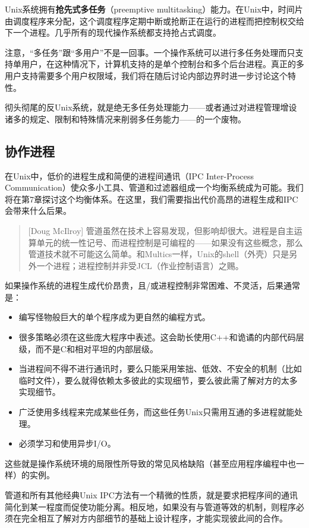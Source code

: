 \documentclass[12pt,oneside]{book}
\begin{document}
Unix系统拥有\textbf{抢先式多任务}（preemptive multitasking）能力。在Unix中，时间片由调度程序来分配，这个调度程序定期中断或抢断正在运行的进程而把控制权交给下一个进程。几乎所有的现代操作系统都支持抢占式调度。

注意，“多任务”跟“多用户”不是一回事。一个操作系统可以进行多任务处理而只支持单用户，在这种情况下，计算机支持的是单个控制台和多个后台进程。真正的多用户支持需要多个用户权限域，我们将在随后讨论内部边界时进一步讨论这个特性。

彻头彻尾的反Unix系统，就是绝无多任务处理能力——或者通过对进程管理增设诸多的规定、限制和特殊情况来削弱多任务能力——的一个废物。

\subsection{协作进程}
在Unix中，低价的进程生成和简便的进程间通讯（IPC Inter-Process Communication）使众多小工具、管道和过滤器组成一个均衡系统成为可能。我们将在第7章探讨这个均衡体系。在这里，我们需要指出代价高昂的进程生成和IPC会带来什么后果。

\begin{quote}[Doug McIlroy]
管道虽然在技术上容易发现，但影响却很大。进程是自主运算单元的统一性记号、而进程控制是可编程的——如果没有这些概念，那么管道技术就不可能这么简单。和Multics一样，Unix的shell（外壳）只是另外一个进程；进程控制并非受JCL（作业控制语言）之赐。
\end{quote}

如果操作系统的进程生成代价昂贵，且/或进程控制非常困难、不灵活，后果通常是：
\begin{itemize}
\item 编写怪物般巨大的单个程序成为更自然的编程方式。
\item 很多策略必须在这些庞大程序中表述。这会助长使用C++和诡谲的内部代码层级，而不是C和相对平坦的内部层级。
\item 当进程间不得不进行通讯时，要么只能采用笨拙、低效、不安全的机制（比如临时文件），要么就得依赖太多彼此的实现细节，要么彼此需了解对方的太多实现细节。
\item 广泛使用多线程来完成某些任务，而这些任务Unix只需用互通的多进程就能处理。
\item 必须学习和使用异步I/O。
\end{itemize}

这些就是操作系统环境的局限性所导致的常见风格缺陷（甚至应用程序编程中也一样）的实例。

管道和所有其他经典Unix IPC方法有一个精微的性质，就是要求把程序间的通讯简化到某一程度而促使功能分离。相反地，如果没有与管道等效的机制，则程序必须在完全相互了解对方内部细节的基础上设计程序，才能实现彼此间的合作。
\end{document}
